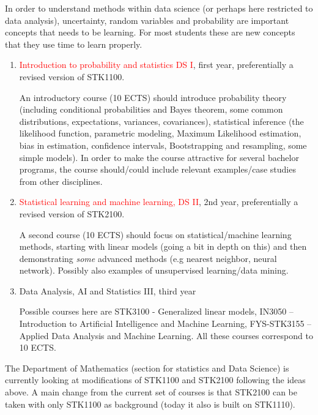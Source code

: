 \documentclass[oneside,final,10pt]{article}
\begin{document}
 In order to understand methods within data science (or perhaps here restricted to data analysis), uncertainty, random variables and probability are important concepts that needs to be learning. For most students these are new concepts that they use time to learn properly. 
\begin{enumerate}
    \item \textcolor{red}{Introduction to probability and statistics DS I}, first year, preferentially a revised version of STK1100.
    
    An introductory course (10 ECTS) should introduce probability theory (including conditional probabilities and Bayes theorem, some common distributions, expectations, variances, covariances), statistical inference (the likelihood function, parametric modeling, Maximum Likelihood estimation, bias in estimation, confidence intervals, Bootstrapping and resampling, some simple models). In order to make the course attractive for several bachelor programs, the course should/could include relevant examples/case studies from other disciplines.
    
    \item \textcolor{red}{Statistical learning and machine learning, DS II}, 2nd year, preferentially a revised version of  STK2100.
    
    A second course (10 ECTS) should focus on statistical/machine learning methods, starting with linear models (going a bit in depth on this) and then demonstrating \emph{some} advanced methods (e.g nearest neighbor, neural network). Possibly also examples of unsupervised learning/data mining.

    \item Data Analysis, AI and Statistics III, third year
    
    Possible courses here are STK3100 - Generalized linear models,  
IN3050 – Introduction to Artificial Intelligence and Machine Learning, FYS-STK3155 – Applied Data Analysis and Machine Learning. All these courses correspond to 10 ECTS.
\end{enumerate}


The Department of Mathematics
(section for statistics and Data Science) is currently looking at modifications of STK1100 and STK2100 following the ideas above. A main change from the current set of courses is that STK2100 can be taken with only STK1100 as background (today it also is built on STK1110).
\end{document}
